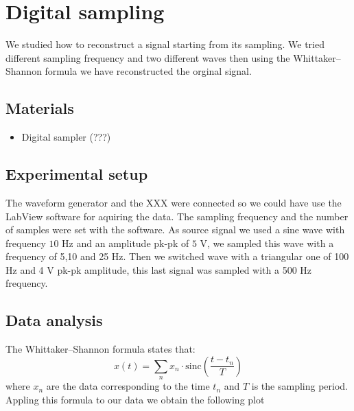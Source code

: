 \chapter{Digital sampling}
We studied how to reconstruct a signal starting from its sampling. We tried different sampling frequency and two different waves then using the Whittaker–Shannon formula we have reconstructed the orginal signal. 

\section{Materials}
\begin{itemize}
\item Digital sampler (???)
\end{itemize}
\section{Experimental setup}
The waveform generator and the XXX were connected so we could have use the LabView software for aquiring the data. The sampling frequency and the number of samples were set with the software. As source signal we used a sine wave with frequency $10$ Hz and an amplitude pk-pk of $5$ V, we sampled this wave with a frequency of 5,10 and 25 Hz. Then we switched wave with a triangular one of 100 Hz and 4 V pk-pk amplitude, this last signal was sampled with a 500 Hz frequency.
\section{Data analysis}
The Whittaker–Shannon formula states that:
\[x(t) = \sum_n x_n\cdot\text{sinc}\left(\frac{t-t_n}{T}\right)\]
where $x_n$ are the data corresponding to the time $t_n$ and $T$ is the sampling period. Appling this formula to our data we obtain the following plot

